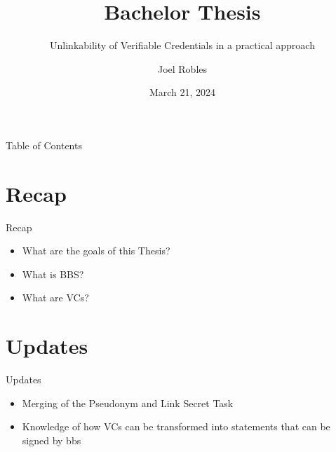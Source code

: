 \documentclass[
	english,%
	authorontitle=true,
	]{bfhbeamer}
\title{Bachelor Thesis}
\subtitle{Unlinkability of Verifiable Credentials in a practical approach}
\author[J. Robles]{Joel Robles}
\institute{TI}
\date{March 21, 2024}
\begin{document}
\maketitle

\begin{frame}{Table of Contents}
    \tableofcontents
\end{frame}

\section{Recap}

\begin{frame}{Recap}
    \begin{itemize}
        \item What are the goals of this Thesis?
        \item What is BBS?
        \item What are VCs?
    \end{itemize}
\end{frame}

\section{Updates}

\begin{frame}{Updates}
    \begin{itemize}
        \item Merging of the Pseudonym and Link Secret Task
        \item Knowledge of how VCs can be transformed into statements that can be signed by bbs
    \end{itemize}
\end{frame}
\end{document}
